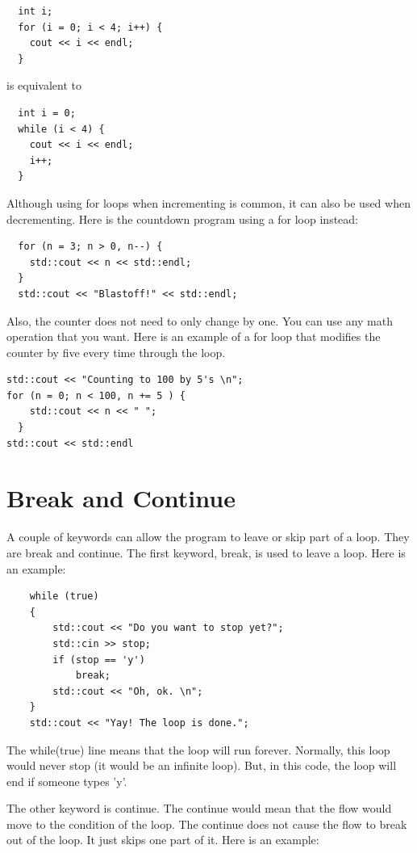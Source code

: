\begin{verbatim}
  int i;
  for (i = 0; i < 4; i++) {
    cout << i << endl;
  }
\end{verbatim}
%
is equivalent to 

\begin{verbatim}
  int i = 0;
  while (i < 4) {
    cout << i << endl;
    i++;
  }
\end{verbatim}

Although using for loops when incrementing is common, it can
also be used when decrementing. Here is the countdown program
using a for loop instead:

\begin{lstlisting}
  for (n = 3; n > 0, n--) {
    std::cout << n << std::endl;
  }
  std::cout << "Blastoff!" << std::endl;
\end{lstlisting}

Also, the counter does not need to only change by one. You can use
any math operation that you want. Here is an example of a for loop
that modifies the counter by five every time through the loop.
\begin{lstlisting}
std::cout << "Counting to 100 by 5's \n";
for (n = 0; n < 100, n += 5 ) {
    std::cout << n << " ";
  }
std::cout << std::endl
\end{lstlisting}

\section{Break and Continue}
A couple of keywords can allow the program to leave or skip part of a loop. They are break and continue. The first keyword, break, is used to leave a loop.
Here is an example:
\begin{lstlisting}
    while (true)
    {
        std::cout << "Do you want to stop yet?";
        std::cin >> stop;
        if (stop == 'y')
            break;
        std::cout << "Oh, ok. \n";
    }
    std::cout << "Yay! The loop is done.";
\end{lstlisting}
The while(true) line means that the loop will
run forever. Normally, this loop would never
stop (it would be an infinite loop). But, in this code, the loop will end if someone types 'y'.

The other keyword is continue. The continue 
would mean that the flow would move to the condition of the loop. The continue does not 
cause the flow to break out of the loop. It just skips one part of it. Here is an example:

